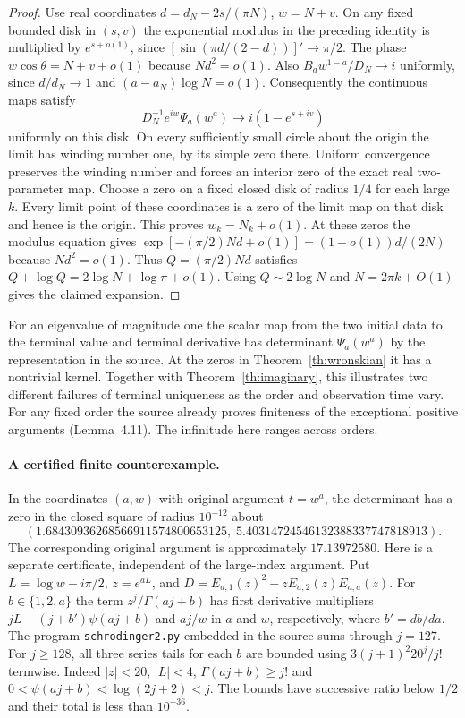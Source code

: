 \documentclass[11pt,a4paper]{article}
\numberwithin{equation}{section}
\begin{document}
\begin{proof}
Use real coordinates $d=d_N-2s/(\pi N)$, $w=N+v$. On any fixed
bounded disk in $(s,v)$ the exponential modulus in the preceding
identity is multiplied by $e^{s+o(1)}$, since
$[\sin(\pi d/(2-d))]'\to\pi/2$. The phase
$w\cos\theta=N+v+o(1)$ because $Nd^2=o(1)$.
Also $B_a w^{1-a}/D_N\to i$ uniformly, since $d/d_N\to1$ and
$(a-a_N)\log N=o(1)$. Consequently the continuous maps satisfy
\[
 D_N^{-1}e^{iw}\Psi_a(w^a)\longrightarrow
 i(1-e^{s+iv})
\]
uniformly on this disk. On every sufficiently small circle about the
origin the limit has winding number one, by its simple zero there.
Uniform convergence preserves the winding number and forces an interior
zero of the exact real two-parameter map. Choose a zero on a fixed
closed disk of radius $1/4$ for each large $k$. Every limit point of
these coordinates is a zero of the limit map on that disk and hence
is the origin. This proves $w_k=N_k+o(1)$. At these zeros the
modulus equation gives
$\exp[-(\pi/2)Nd+o(1)]=(1+o(1))d/(2N)$ because $Nd^2=o(1)$.
Thus $Q=(\pi/2)Nd$ satisfies $Q+\log Q=2\log N+\log\pi+o(1)$.
Using $Q\sim2\log N$ and $N=2\pi k+O(1)$ gives the claimed expansion.
\end{proof}

For an eigenvalue of magnitude one the scalar map from the two initial
data to the terminal value and terminal derivative has determinant
$\Psi_a(w^a)$ by the representation in the source. At the zeros in
Theorem~\ref{th:wronskian} it has a nontrivial kernel. Together with
Theorem~\ref{th:imaginary}, this illustrates two different failures of
terminal uniqueness as the order and observation time vary. For any fixed
order the source already proves finiteness of the exceptional positive
arguments (Lemma~4.11). The infinitude here ranges across orders.


\paragraph{A certified finite counterexample.}
In the coordinates $(a,w)$ with original argument $t=w^a$, the
determinant has a zero in the closed square of radius $10^{-12}$
about
\[
 (1.68430936268566911574800653125,\;
  5.40314724546132388337747818913).
\]
The corresponding original argument is approximately $17.13972580$.
Here is a separate certificate, independent of the large-index
argument. Put $L=\log w-i\pi/2$, $z=e^{aL}$, and
$D=E_{a,1}(z)^2-zE_{a,2}(z)E_{a,a}(z)$. For
$b\in\{1,2,a\}$ the term $z^j/\Gamma(aj+b)$ has first derivative
multipliers $jL-(j+b')\psi(aj+b)$ and $aj/w$ in $a$ and $w$,
respectively, where $b'=db/da$. The program
\texttt{schrodinger2.py} embedded in the source sums through $j=127$.
For $j\ge128$, all three series tails for each $b$ are bounded
using $3(j+1)^2 20^j/j!$ termwise. Indeed $|z|<20$, $|L|<4$,
$\Gamma(aj+b)\ge j!$ and $0<\psi(aj+b)<\log(2j+2)<j$.
The bounds have successive ratio below $1/2$ and their total is
less than $10^{-36}$.
\end{document}
